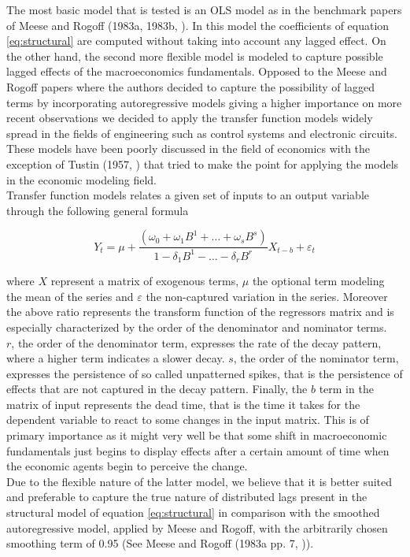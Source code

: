 The most basic model that is tested is an OLS model as in the benchmark papers of Meese
and Rogoff (1983a, 1983b, \cite{MeeseRogoffa, MeeseRogoffb}). In this model the
coefficients of equation \ref{eq:structural} are computed without taking into account any lagged effect.
On the other hand, the second more flexible model is modeled to capture possible lagged effects
of the macroeconomics fundamentals. Opposed to the Meese and Rogoff papers where the authors decided
to capture the possibility of lagged terms by incorporating autoregressive models giving a higher
importance on more recent observations we decided to apply the transfer function models widely spread in
the fields of engineering such as control systems and electronic circuits. These models have been poorly
discussed in the field of economics with the exception of Tustin (1957, \cite{Tustin}) that tried to
make the point for applying the models in the economic modeling field.\\
Transfer function models relates a given set of inputs to an output variable through the following general formula

\begin{equation} \label{eq:transfer}
  Y_{t} = \mu + \frac{(\omega_{0}+\omega_{1}B^{1}+\dots+\omega_{s}B^{s})}{1-\delta_{1}B^{1}-\dots-\delta_{r}B^{r}}X_{t-b} + \varepsilon_{t}
\end{equation}

where $X$ represent a matrix of exogenous terms, $\mu$ the optional term modeling the mean of the series and
$\varepsilon$ the non-captured variation in the series. Moreover the above ratio represents the transform
function of the regressors matrix and is especially characterized by the order of the denominator and
nominator terms. \\
$r$, the order of the denominator term, expresses the rate of the decay pattern, where
a higher term indicates a slower decay.  $s$, the order of the nominator term, expresses the persistence of
so called unpatterned spikes, that is the persistence of effects that are not captured in the decay pattern.
Finally, the $b$ term in the matrix of input represents the dead time, that is the time it takes for the dependent
variable to react to some changes in the input matrix. This is of primary importance as it might very well be
that some shift in macroeconomic fundamentals just begins to display effects after a certain amount of time when
the economic agents begin to perceive the change.\\
Due to the flexible nature of the latter model, we believe that it is better suited and preferable to
capture the true nature of distributed lags present in the structural model of equation \ref{eq:structural} in
comparison with the smoothed autoregressive model, applied by Meese and Rogoff, with the arbitrarily chosen smoothing
term of 0.95 (See Meese and Rogoff (1983a pp. 7, \cite{MeeseRogoffa})).


